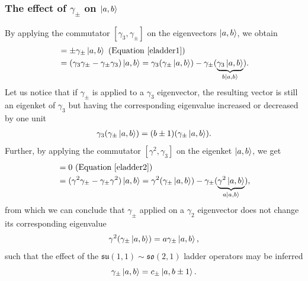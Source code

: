 \documentclass[12pt,a4paper]{report}
\theoremstyle{definition}
\theoremstyle{remark}
\theoremstyle{remark}
\begin{document}
\subsubsection{The effect of $\gamma_\pm$ on $\ket{a,b}$}
By applying the commutator $[\gamma_3,\gamma_\pm]$ on the eigenvectors $\ket{a,b}$, we obtain
\begin{align*}
[\gamma_3,\gamma_\pm]&=\pm\gamma_\pm\ket{a,b} \text{ (Equation~\ref{eladder1})}\\
&=(\gamma_3\gamma_\pm-\gamma_\pm\gamma_3)\ket{a,b}= \gamma_3(\gamma_\pm\ket{a,b})-\gamma_\pm(\underbrace{\gamma_3\ket{a,b}}_{b\ket{a,b}}).
\end{align*}
Let us notice that if $\gamma_\pm$ is applied to a $\gamma_3$ eigenvector, the resulting vector is still an eigenket of $\gamma_3$ but having the corresponding eigenvalue increased or decreased by one unit
\begin{align*}
\gamma_3(\gamma_\pm\ket{a,b})=(b\pm 1)(\gamma_\pm\ket{a,b}).
\end{align*}
Further, by applying the commutator $[\gamma^2,\gamma_3]$ on the eigenket $\ket{a,b}$, we get
\begin{align*}
[\gamma^2,\gamma_\pm]&=0 \text{ (Equation~\ref{eladder2})}\\
&=(\gamma^2\gamma_\pm-\gamma_\pm\gamma^2)\ket{a,b}= \gamma^2(\gamma_\pm\ket{a,b})-\gamma_\pm(\underbrace{\gamma^2\ket{a,b}}_{a\ket{a,b}}),
\end{align*}
from which we can conclude that $\gamma_\pm$ applied on a $\gamma_2$ eigenvector does not change its corresponding eigenvalue
\begin{align*}
\gamma^2(\gamma_\pm\ket{a,b})=a\gamma_\pm\ket{a,b},
\end{align*}
such that the effect of the $\mathfrak{su}(1,1)\sim\mathfrak{so}(2,1)$ ladder operators may be inferred
\begin{equation}\label{eladder3}
\gamma_\pm\ket{a,b}=c_\pm\ket{a,b\pm 1}.
\end{equation}
\end{document}
